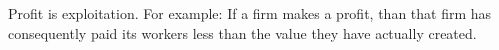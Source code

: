 Profit is exploitation.
For example: If a firm makes a profit, than that firm has consequently paid its workers less than the value they have actually created.